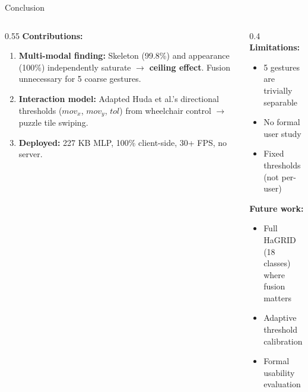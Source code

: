 \documentclass[aspectratio=169]{beamer}
\begin{document}
\begin{frame}{Conclusion}
    \vspace{0.5em}
    \begin{columns}[T]
    \begin{column}{0.55\textwidth}
        \textbf{Contributions:}
        \begin{enumerate}
            \setlength\itemsep{0.8em}
            \item \textbf{Multi-modal finding:} Skeleton (99.8\%) and appearance (100\%) independently saturate $\to$ \textbf{ceiling effect}. Fusion unnecessary for 5 coarse gestures.

            \item \textbf{Interaction model:} Adapted Huda et al.'s directional thresholds ($mov_x$, $mov_y$, $tol$) from wheelchair control $\to$ puzzle tile swiping.

            \item \textbf{Deployed:} 227 KB MLP, 100\% client-side, 30+ FPS, no server.
        \end{enumerate}
    \end{column}
    \begin{column}{0.4\textwidth}
        \textbf{Limitations:}
        \begin{itemize}
            \item 5 gestures are trivially separable
            \item No formal user study
            \item Fixed thresholds (not per-user)
        \end{itemize}

        \vspace{0.8em}
        \textbf{Future work:}
        \begin{itemize}
            \item Full HaGRID (18 classes)\\where fusion matters
            \item Adaptive threshold calibration
            \item Formal usability evaluation
        \end{itemize}
    \end{column}
    \end{columns}
\end{frame}
\end{document}
